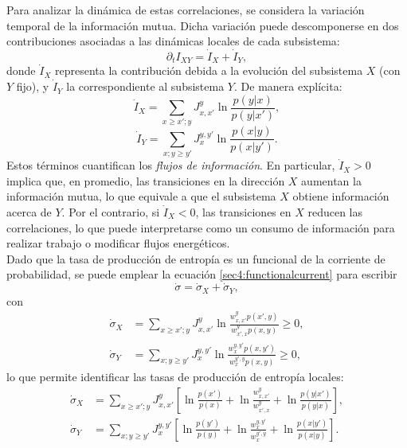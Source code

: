 Para analizar la dinámica de estas correlaciones, se considera la variación temporal de la información mutua. Dicha variación puede descomponerse en dos contribuciones asociadas a las dinámicas locales de cada subsistema:
\[
\partial_t I_{XY} = \dot{I}_{X} + \dot{I}_{Y},
\]
donde \( \dot{I}_{X} \) representa la contribución debida a la evolución del subsistema \( X \) (con \( Y \) fijo), y \( \dot{I}_{Y} \) la correspondiente al subsistema \( Y \)\cite{horowitz2014thermodynamics}. De manera explícita:
\begin{equation}
    \dot{I}_{X}  = \sum_{x\geq x'; y}J_{x,x'}^{y} \ln \frac{ p(y|x) }{p(y|x')},
    \label{sec4:clasicalflows0}
\end{equation}
\begin{equation}    
    \dot{I}_{Y}  = \sum_{x;y\geq y'} J_{x}^{y,y'} \ln \frac{p(x|y)}{ p(x|y') }.
    \label{sec4:clasicalflows}
\end{equation}
Estos términos cuantifican los \textit{flujos de información}. En particular, \( \dot{I}_{X} > 0 \) implica que, en promedio, las transiciones en la dirección \( X \) aumentan la información mutua, lo que equivale a que el subsistema \( X \) obtiene información acerca de \( Y \). Por el contrario, si \( \dot{I}_{X} < 0 \), las transiciones en \( X \) reducen las correlaciones, lo que puede interpretarse como un consumo de información para realizar trabajo o modificar flujos energéticos.
\\

Dado que la tasa de producción de entropía es un funcional de la corriente de probabilidad, se puede emplear la ecuación \eqref{sec4:functionalcurrent} para escribir
\[
\dot{\sigma} = \dot{\sigma}_{X} + \dot{\sigma}_{Y},
\]
con
\begin{align*}
    \dot{\sigma}_{X} & = \sum_{x \geq x';y} J_{x,x'}^{y} \ln  \frac{w_{x,x'}^{y} p(x',y) }{w_{x',x}^{y} p(x,y) } \geq 0, \\
    \dot{\sigma}_{Y} & = \sum_{x;y\geq y'}J_{x}^{y,y'} \ln \frac{w_{x}^{y,y'} p(x,y') }{ w_{x}^{y',y} p(x,y) } \geq 0,
\end{align*}
lo que permite identificar las tasas de producción de entropía locales:
\begin{align*}
    \dot{\sigma}_{X} &  = \sum_{x \geq x';y} J_{x,x'}^{y} \left[ \ln \frac{p(x')}{p(x)}  +\ln \frac{w_{x,x'}^{y}}{ w_{x',x}^{y} } + \ln \frac{p(y|x')}{p(y|x)} \right], \\
    \dot{\sigma}_{Y} &  = \sum_{x;y \geq y'} J_{x}^{y,y'} \left[ \ln \frac{p(y')}{p(y)}  + \ln \frac{w_{x}^{y,y'}}{ w_{x}^{y',y} } + \ln \frac{p(x|y')}{p(x|y)} \right].
\end{align*}

